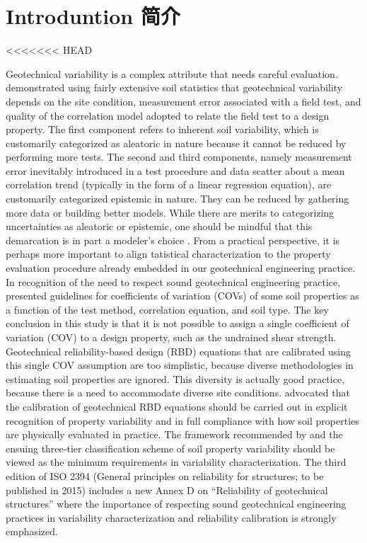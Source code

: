 \section{Introduntion 简介}

<<<<<<< HEAD
\begin{paracol}{2}

    Geotechnical variability is a complex attribute that needs careful evaluation. \citet{Phoon1999612} demonstrated using fairly extensive soil statistics that geotechnical variability depends on the site condition, measurement error associated with a field test, and quality of the correlation model adopted to relate the field test to a design property. The first component refers to inherent soil variability, which is customarily categorized as aleatoric in nature because it cannot be reduced by performing more tests. The second and third components, namely measurement error inevitably introduced in a test procedure and data scatter about a mean correlation trend (typically in the form of a linear regression equation), are customarily categorized epistemic in nature. They can be reduced by gathering more data or building better models. While there are merits to categorizing uncertainties as aleatoric or epistemic, one should be mindful that this demarcation is in part a modeler’s choice \citep{DerKiureghian2007}. From a practical perspective, it is perhaps more important to align tatistical characterization to the property evaluation procedure already embedded in our geotechnical engineering practice. In recognition of the need to respect sound geotechnical engineering practice, \citet{Phoon1999625} presented guidelines for coefficients of variation (COVs) of some soil properties as a function of the test method, correlation equation, and soil type. The key conclusion in this study is that it is not possible to assign a single coefficient of variation (COV) to a design property, such as the undrained shear strength. Geotechnical reliability-based design (RBD) equations that are calibrated using this single COV assumption are too simplistic, because diverse methodologies in estimating soil properties are ignored. This diversity is actually good practice, because there is a need to accommodate diverse site conditions. \citet{Phoon1999612,Phoon1999625} advocated that the calibration of geotechnical RBD equations should be carried out in explicit recognition of property variability and in full compliance with how soil properties are physically evaluated in practice. The framework recommended by \citet{Phoon1999612,Phoon1999625} and the ensuing three-tier classification scheme of soil property variability \citep{Phoon2008344} should be viewed as the minimum requirements in variability characterization. The third edition of ISO 2394 (General principles on reliability for structures; to be published in 2015) includes a new Annex D on “Reliability of geotechnical structures” where the importance of respecting sound geotechnical engineering practices in variability characterization and reliability calibration is strongly emphasized.


\end{paracol}
